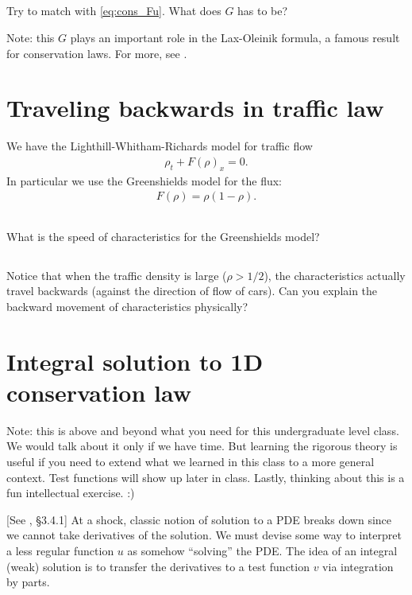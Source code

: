 \documentclass[11pt,letterpaper]{article}
\begin{document}
\subsection{}
Try to match with \eqref{eq:cons_Fu}. What does $G$ has to be? 

Note: this $G$ plays an important role in the Lax-Oleinik formula, a famous result for conservation laws. For more, see \cite[\S 3.4.2]{Evans_10}.

\newpage
\section{Traveling backwards in traffic law}
We have the Lighthill-Whitham-Richards model for traffic flow
\begin{align}
    \rho_t + F(\rho)_x = 0.
\end{align}
In particular we use the Greenshields model for the flux:
\begin{align}
    F(\rho) = \rho(1-\rho).
\end{align}

\subsection{}
What is the speed of characteristics for the Greenshields model?

\subsection{}
Notice that when the traffic density is large ($\rho>1/2$), the characteristics actually travel backwards (against the direction of flow of cars). Can you explain the backward movement of characteristics physically?

\section{Integral solution to 1D conservation law}
Note: this is above and beyond what you need for this undergraduate level class. We would talk about it only if we have time. But learning the rigorous theory is useful if you need to extend what we learned in this class to a more general context. Test functions will show up later in class. Lastly, thinking about this is a fun intellectual exercise. :)

[See \cite{Evans_10}, \S 3.4.1] At a shock, classic notion of solution to a PDE breaks down since we cannot take derivatives of the solution. We must devise some way to interpret a less regular function $u$ as somehow ``solving'' the PDE. The idea of an integral (weak) solution is to transfer the derivatives to a test function $v$ via integration by parts. 
\end{document}

